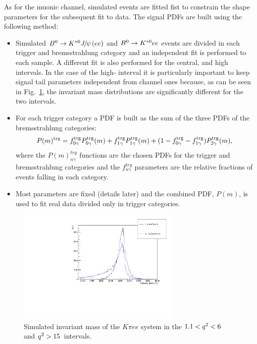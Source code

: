 As for the muonic channel, simulated events are fitted fist to constrain
the shape parameters for the subsequent fit to data. The signal PDFs are built using the following method:
%
\begin{itemize}
\item Simulated $\Bz\to\Kstarz\jpsi(ee)$ and ${{B}^0}\rightarrow{\ensuremath{{K}^{*0}}} ee$ events are divided
in each trigger and bremsstrahlung category and an independent fit is performed to each sample.
A different fit is also performed for the central, \jpsi and high \qsq intervals. In the case of the high-\qsq 
interval it is particularly important to keep signal tail parameters independent from \jpsi channel ones
because, as can be seen in Fig.~\ref{fig:high_central_mass_comparison}, the invariant mass
distributions are significantly different for the two intervals.
\item For each trigger category a PDF is built as the sum of the three PDFs of the bremsstrahlung categories:
\begin{equation}
P(m)^{\rm trg} = f^{\rm trg}_{0\gamma} P^{\rm trg}_{0\gamma}(m) + f^{\rm trg}_{1\gamma} P^{\rm trg}_{1\gamma}(m) + (1 - f^{\rm trg}_{0\gamma} - f^{\rm trg}_{1\gamma}) P^{\rm trg}_{2\gamma}(m),
\end{equation}
where the $P(m)^{trg}_{n\gamma}$ functions are the chosen PDFs for the trigger and bremsstrahlung categories
and the $f^{trg}_{n\gamma}$ parameters are the relative fractions of events falling in each category.
\item Most parameters are fixed (details later) and the combined PDF, $P(m)$,
is used to fit real data divided only in trigger categories.
\end{itemize}
%
 \begin{figure}[h!]
\centering
\includegraphics[width=0.70\textwidth]{RKst/figs/high_central_mass_comparison.pdf}
\caption{Simulated invariant mass of the $K\pi ee$ system in the $1.1 < {q^2} < 6$ and ${q^2} > 15$~\gevgevcccc intervals.  }
\label{fig:high_central_mass_comparison}
\end{figure}

